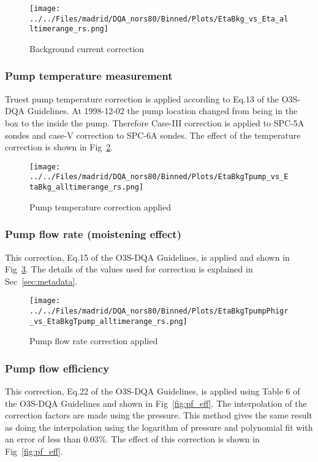                 \begin{figure}
        \centering
\texttt{[image: ../../Files/madrid/DQA\_nors80/Binned/Plots/EtaBkg\_vs\_Eta\_alltimerange\_rs.png]}
    \caption{Background current correction}
            \label{fig:bkg}
    \end{figure}
%
            \subsubsection{Pump temperature measurement}
 Truest pump temperature correction is applied according to Eq.13 of the O3S-DQA Guidelines. At 1998-12-02 the pump location
 changed from being in the box to the inside the pump.
    Therefore Case-III correction is applied to SPC-5A sondes and case-V correction to SPC-6A sondes. The effect of the temperature correction
is shown in  Fig~\ref{fig:tpump}.
%
%
                    \begin{figure}
        \centering
\texttt{[image: ../../Files/madrid/DQA\_nors80/Binned/Plots/EtaBkgTpump\_vs\_EtaBkg\_alltimerange\_rs.png]}
    \caption{Pump temperature correction applied}
            \label{fig:tpump}
    \end{figure}
%
                \subsubsection{Pump flow rate (moistening effect)}
    This correction, Eq.15 of the O3S-DQA Guidelines, is applied and shown in Fig~\ref{fig:pf_ptu}. The details of the values used for
    correction is explained in Sec~\ref{sec:metadata}.

                        \begin{figure}
        \centering
\texttt{[image: ../../Files/madrid/DQA\_nors80/Binned/Plots/EtaBkgTpumpPhigr\_vs\_EtaBkgTpump\_alltimerange\_rs.png]}
    \caption{Pump flow rate correction applied}
            \label{fig:pf_ptu}
    \end{figure}
%
                   \subsubsection{Pump flow efficiency}
    This correction, Eq.22 of the O3S-DQA Guidelines, is applied using Table 6 of the O3S-DQA Guidelines and shown in Fig~\ref{fig:pf_eff}.
The interpolation of the correction factors are made using the pressure. This method gives the same result as doing the interpolation using the logarithm of pressure
and polynomial fit with an error of less than $0.03\%$. The effect of this correction is shown in Fig~\ref{fig:pf_eff}.

